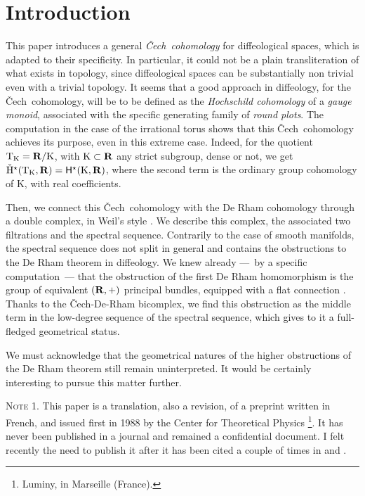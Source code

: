 \documentclass[12pt,reqno]{amsart}
\theoremstyle{article}
\def \K{\mathrm K}
\def \T{\mathrm T}
\newcommand{\RR}{{\bf R}}
\newcommand{\sH}{\mathsf{H}}
\newcommand{\Cech}{\v{C}ech\ }
\newcommand{\vH}{\check{\mathrm{H}}}
\begin{document}
  \section*{Introduction}
  
  This paper introduces a general \emph{\Cech cohomology} for diffeological spaces,
  which is adapted to their specificity.
  In particular,
  it could not be a plain transliteration of what exists in topology,
  since diffeological spaces can be substantially non trivial even with a trivial topology.
  It seems that a good approach in diffeology,
  for the \Cech cohomology,
  will be to be defined as the \emph{Hochschild cohomology} of a \emph{gauge monoid},
  associated with the specific generating family of \emph{round plots}.
  The computation in the case of the irrational torus shows that this \Cech cohomology achieves its purpose,
  even in this extreme case.
  Indeed,
  for the quotient $\T_\K = \RR/\K$,
  with $\K \subset \RR$ any strict subgroup,
  dense or not,
  we get $\vH^\star(\T_\K,\RR) = \sH^\star(\K,\RR)$,
  where the second term is the ordinary group cohomology of $\K$,
  with real coefficients.
  
  Then,
  we connect this \Cech cohomology with the De Rham cohomology through a double complex,
  in Weil's style \cite{Wei52}.
  We describe this complex,
  the associated two filtrations and the spectral sequence.
  Contrarily to the case of smooth manifolds,
  the spectral sequence does not split in general and contains the obstructions to the De Rham theorem in diffeology.
  We knew already
  ---~by a specific computation~---
  that the obstruction of the first De Rham homomorphism is the group of equivalent $(\RR,+)$ principal bundles,
  equipped with a flat connection \cite{Igl85}.
  Thanks to the \v{C}ech-De-Rham bicomplex,
  we find this obstruction as the middle term in the low-degree sequence of the spectral sequence,
  which gives to it a full-fledged geometrical status.
  
  We must acknowledge that the geometrical natures of the higher obstructions of the De Rham theorem still remain uninterpreted.
  It would be certainly interesting to pursue this matter further.
  
  \textsc{Note 1.} This paper is a translation,
  also a revision,
  of a preprint \cite{PI88-91} written in French,
  and issued first in 1988 by the Center for Theoretical Physics%
  \footnote{Luminy, in Marseille (France).}.
  It has never been published in a journal and remained a confidential document.
  I felt recently the need to publish it after it has been cited a couple of times in \cite{Gur14} and \cite{Kur19}.
  
\end{document}
